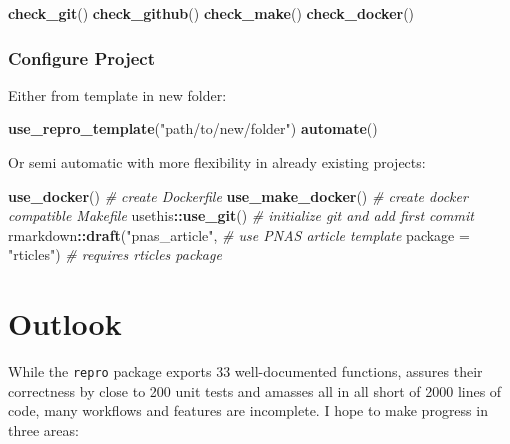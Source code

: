 \documentclass[12pt,a4paper,]{article}
\newenvironment{Shaded}{\begin{snugshade}}{\end{snugshade}}
\newcommand{\CommentTok}[1]{\textcolor[rgb]{0.56,0.35,0.01}{\textit{#1}}}
\newcommand{\DataTypeTok}[1]{\textcolor[rgb]{0.13,0.29,0.53}{#1}}
\newcommand{\KeywordTok}[1]{\textcolor[rgb]{0.13,0.29,0.53}{\textbf{#1}}}
\newcommand{\NormalTok}[1]{#1}
\newcommand{\OperatorTok}[1]{\textcolor[rgb]{0.81,0.36,0.00}{\textbf{#1}}}
\newcommand{\StringTok}[1]{\textcolor[rgb]{0.31,0.60,0.02}{#1}}
\begin{document}
\begin{Shaded}
\begin{Highlighting}[]
\KeywordTok{check_git}\NormalTok{()}
\KeywordTok{check_github}\NormalTok{()}
\KeywordTok{check_make}\NormalTok{()}
\KeywordTok{check_docker}\NormalTok{()}
\end{Highlighting}
\end{Shaded}

\hypertarget{configure-project}{%
\subsubsection{Configure Project}\label{configure-project}}

Either from template in new folder:

\begin{Shaded}
\begin{Highlighting}[]
\KeywordTok{use_repro_template}\NormalTok{(}\StringTok{"path/to/new/folder"}\NormalTok{)}
\KeywordTok{automate}\NormalTok{()}
\end{Highlighting}
\end{Shaded}

Or semi automatic with more flexibility in already existing projects:

\begin{Shaded}
\begin{Highlighting}[]
\KeywordTok{use_docker}\NormalTok{() }\CommentTok{# create Dockerfile}
\KeywordTok{use_make_docker}\NormalTok{() }\CommentTok{# create docker compatible Makefile}
\NormalTok{usethis}\OperatorTok{::}\KeywordTok{use_git}\NormalTok{() }\CommentTok{# initialize git and add first commit}
\NormalTok{rmarkdown}\OperatorTok{::}\KeywordTok{draft}\NormalTok{(}\StringTok{"pnas_article"}\NormalTok{, }\CommentTok{# use PNAS article template}
                 \DataTypeTok{package =} \StringTok{"rticles"}\NormalTok{) }\CommentTok{# requires rticles package}
\end{Highlighting}
\end{Shaded}

\hypertarget{outlook}{%
\section{Outlook}\label{outlook}}

While the \texttt{repro} package exports 33 well-documented functions, assures their correctness by close to 200 unit tests and amasses all in all short of 2000 lines of code, many workflows and features are incomplete.
I hope to make progress in three areas:
\end{document}
